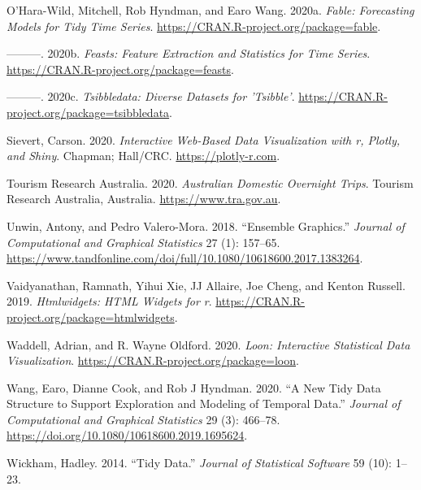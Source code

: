 \begin{CSLReferences}{1}{0}
\leavevmode{}%
O'Hara-Wild, Mitchell, Rob Hyndman, and Earo Wang. 2020a. \emph{Fable: Forecasting Models for Tidy Time Series}. \url{https://CRAN.R-project.org/package=fable}.

\leavevmode{}%
---------. 2020b. \emph{Feasts: Feature Extraction and Statistics for Time Series}. \url{https://CRAN.R-project.org/package=feasts}.

\leavevmode{}%
---------. 2020c. \emph{Tsibbledata: Diverse Datasets for 'Tsibble'}. \url{https://CRAN.R-project.org/package=tsibbledata}.

\leavevmode{}%
Sievert, Carson. 2020. \emph{Interactive Web-Based Data Visualization with r, Plotly, and Shiny}. Chapman; Hall/CRC. \url{https://plotly-r.com}.

\leavevmode{}%
Tourism Research Australia. 2020. \emph{Australian Domestic Overnight Trips}. Tourism Research Australia, Australia. \url{https://www.tra.gov.au}.

\leavevmode{}%
Unwin, Antony, and Pedro Valero-Mora. 2018. {``Ensemble {Graphics}.''} \emph{Journal of Computational and Graphical Statistics} 27 (1): 157--65. \url{https://www.tandfonline.com/doi/full/10.1080/10618600.2017.1383264}.

\leavevmode{}%
Vaidyanathan, Ramnath, Yihui Xie, JJ Allaire, Joe Cheng, and Kenton Russell. 2019. \emph{Htmlwidgets: HTML Widgets for r}. \url{https://CRAN.R-project.org/package=htmlwidgets}.

\leavevmode{}%
Waddell, Adrian, and R. Wayne Oldford. 2020. \emph{Loon: Interactive Statistical Data Visualization}. \url{https://CRAN.R-project.org/package=loon}.

\leavevmode{}%
Wang, Earo, Dianne Cook, and Rob J Hyndman. 2020. {``A New Tidy Data Structure to Support Exploration and Modeling of Temporal Data.''} \emph{Journal of Computational and Graphical Statistics} 29 (3): 466--78. \url{https://doi.org/10.1080/10618600.2019.1695624}.

\leavevmode{}%
Wickham, Hadley. 2014. {``Tidy Data.''} \emph{Journal of Statistical Software} 59 (10): 1--23.


\end{CSLReferences}
